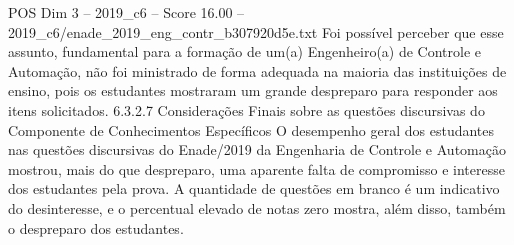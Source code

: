 \begin{textsample}{POS Dim 3 – 2019\_c6 – Score 16.00 – 2019\_c6/enade\_2019\_eng\_contr\_b307920d5e.txt}
Foi possível perceber que esse assunto, fundamental para a formação de um(a) Engenheiro(a) de Controle e Automação, não foi ministrado de forma adequada na maioria das instituições de ensino, pois os estudantes mostraram um grande despreparo para responder aos itens solicitados. 6.3.2.7 Considerações Finais sobre as questões discursivas do Componente de Conhecimentos Específicos O desempenho geral dos estudantes nas questões discursivas do Enade/2019 da Engenharia de Controle e Automação mostrou, mais do que despreparo, uma aparente falta de compromisso e interesse dos estudantes pela prova.
A quantidade de questões em branco é um indicativo do desinteresse, e o percentual elevado de notas zero mostra, além disso, também o despreparo dos estudantes.

\end{textsample}
